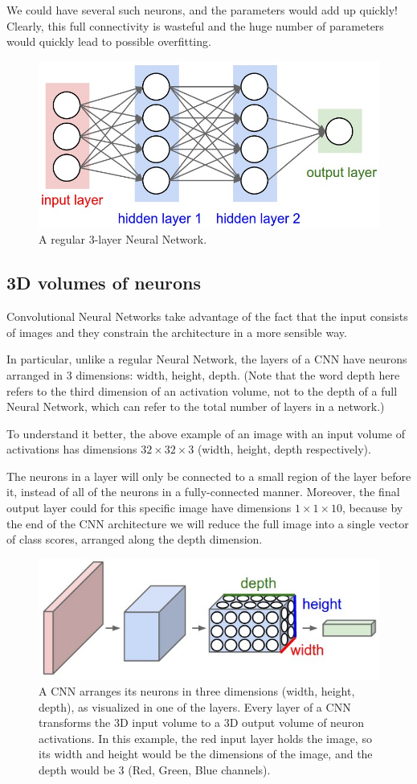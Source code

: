 \documentclass[%
oneside,                 %
final,                   %
10pt]{article}
\begin{document}
We could have
several such neurons, and the parameters would add up quickly! Clearly,
this full connectivity is wasteful and the huge number of parameters
would quickly lead to possible overfitting.

\begin{figure}[!ht]  %
  \centerline{\includegraphics[width=0.6\linewidth]{figslides/nn.jpeg}}
  \caption{
  A regular 3-layer Neural Network.
  }
\end{figure}

\subsection{3D volumes of neurons}

Convolutional Neural Networks take advantage of the fact that the
input consists of images and they constrain the architecture in a more
sensible way. 

In particular, unlike a regular Neural Network, the
layers of a CNN have neurons arranged in 3 dimensions: width,
height, depth. (Note that the word depth here refers to the third
dimension of an activation volume, not to the depth of a full Neural
Network, which can refer to the total number of layers in a network.)

To understand it better, the above example of an image 
with an input volume of
activations has dimensions $32\times 32\times 3$ (width, height,
depth respectively). 

The neurons in a layer will
only be connected to a small region of the layer before it, instead of
all of the neurons in a fully-connected manner. Moreover, the final
output layer could  for this specific image have dimensions $1\times 1 \times 10$, 
because by the
end of the CNN architecture we will reduce the full image into a
single vector of class scores, arranged along the depth
dimension. 

\begin{figure}[!ht]  %
  \centerline{\includegraphics[width=0.6\linewidth]{figslides/cnn.jpeg}}
  \caption{
  A CNN arranges its neurons in three dimensions (width, height, depth), as visualized in one of the layers. Every layer of a CNN transforms the 3D input volume to a 3D output volume of neuron activations. In this example, the red input layer holds the image, so its width and height would be the dimensions of the image, and the depth would be 3 (Red, Green, Blue channels).
  }
\end{figure}
\end{document}
